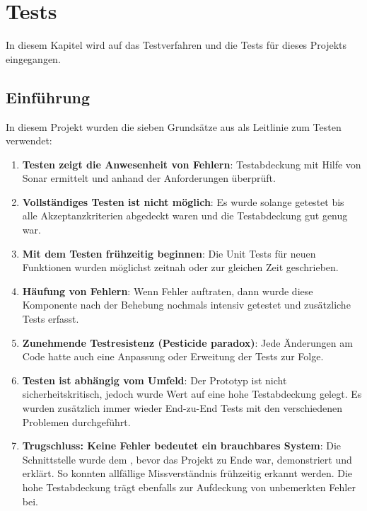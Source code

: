 %
%

\chapter{Tests \resultAssignment{[R6]}}\label{chap.tests} 
In diesem Kapitel wird auf das Testverfahren und die Tests für dieses Projekts eingegangen.

\section{Einführung}
In diesem Projekt wurden die sieben Grundsätze aus \cite{test_soft_book} als Leitlinie zum Testen verwendet:
\begin{enumerate}
\item \textbf{Testen zeigt die Anwesenheit von Fehlern}: Testabdeckung mit Hilfe von Sonar ermittelt und anhand der Anforderungen überprüft.
\item \textbf{Vollständiges Testen ist nicht möglich}: Es wurde solange getestet bis alle Akzeptanzkriterien abgedeckt waren und die Testabdeckung gut genug war.
\item \textbf{Mit dem Testen frühzeitig beginnen}: Die Unit Tests für neuen Funktionen wurden möglichst zeitnah oder zur gleichen Zeit geschrieben.
\item \textbf{Häufung von Fehlern}: Wenn Fehler auftraten, dann wurde diese Komponente nach der Behebung nochmals intensiv getestet und zusätzliche Tests erfasst.
\item \textbf{Zunehmende Testresistenz (Pesticide paradox)}: Jede Änderungen am Code hatte auch eine Anpassung oder Erweitung der Tests zur Folge.
\item \textbf{Testen ist abhängig vom Umfeld}: Der Prototyp ist nicht sicherheitskritisch, jedoch wurde Wert auf eine hohe Testabdeckung gelegt. Es wurden zusätzlich immer wieder 
	End-zu-End Tests mit den verschiedenen Problemen durchgeführt.
\item \textbf{Trugschluss: Keine Fehler bedeutet ein brauchbares System}: Die Schnittstelle wurde dem , bevor das Projekt zu Ende war, demonstriert und erklärt. So 
	konnten allfällige Missverständnis frühzeitig erkannt werden. Die hohe Testabdeckung trägt ebenfalls zur Aufdeckung von unbemerkten Fehler bei.
\end{enumerate}

